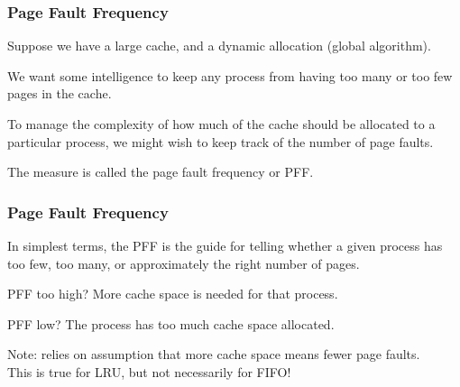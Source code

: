 \begin{frame}
\frametitle{Page Fault Frequency}

Suppose we have a large cache, and a dynamic allocation (global algorithm).

We want some intelligence to keep any process from having too many or too few pages in the cache. 

To manage the complexity of how much of the cache should be allocated to a particular process, we might wish to keep track of the number of page faults.

The measure is called the \alert{page fault frequency} or PFF. 


\end{frame}

\begin{frame}
\frametitle{Page Fault Frequency}

In simplest terms, the PFF is the guide for telling whether a given process has too few, too many, or approximately the right number of pages. 

PFF too high? More cache space is needed for that process. 

PFF low? The process has too much cache space allocated.

Note: relies on assumption that more cache space means fewer page faults.\\
\quad This is true for LRU, but not necessarily for FIFO!

\end{frame}



